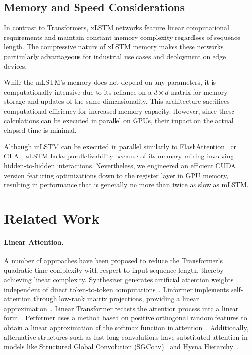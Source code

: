 \subsection{Memory and Speed Considerations}

In contrast to Transformers, xLSTM networks feature linear computational requirements and maintain constant memory complexity regardless of sequence length. The compressive nature of xLSTM memory makes these networks particularly advantageous for industrial use cases and deployment on edge devices.

While the mLSTM's memory does not depend on any parameters, it is computationally intensive due to its reliance on a $d \times d$ matrix for memory storage and updates of the same dimensionality. This architecture sacrifices computational efficiency for increased memory capacity. However, since these calculations can be executed in parallel on GPUs, their impact on the actual elapsed time is minimal.

Although mLSTM can be executed in parallel similarly to FlashAttention~\citep{Dao:22,Dao:23} or GLA~\citep{Yang:23arxiv}, sLSTM lacks parallelizability because of its memory mixing involving hidden-to-hidden interactions. Nevertheless, we engineered an efficient CUDA version featuring optimizations down to the register layer in GPU memory, resulting in performance that is generally no more than twice as slow as mLSTM.

\section{Related Work}
\label{sec:related}

\paragraph{Linear Attention.} A number of approaches have been proposed to reduce the Transformer’s quadratic time complexity with respect to input sequence length, thereby achieving linear complexity. Synthesizer generates artificial attention weights independent of direct token-to-token computations~\citep{Tay:20arxiv}. Linformer implements self-attention through low-rank matrix projections, providing a linear approximation~\citep{Wang:20arxiv}. Linear Transformer recasts the attention process into a linear form~\citep{Katharopoulos:20}. Performer uses a method based on positive orthogonal random features to obtain a linear approximation of the softmax function in attention~\citep{Choromanski:21}. Additionally, alternative structures such as fast long convolutions have substituted attention in models like Structured Global Convolution (SGConv)~\citep{Li:22} and Hyena Hierarchy~\citep{Poli:23}.

